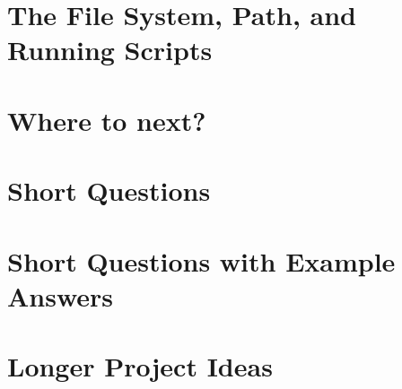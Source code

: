 \documentclass{book}
\begin{document}
\chapter{The File System, Path, and Running Scripts}
\label{ch:files}


\chapter{Where to next?}
\label{ch:next}


\appendix

\chapter{Short Questions}
\label{ap:short}


\chapter{Short Questions with Example Answers}
\label{ap:answers}


\chapter{Longer Project Ideas}
\label{ap:longer}


\backmatter

\end{document}
